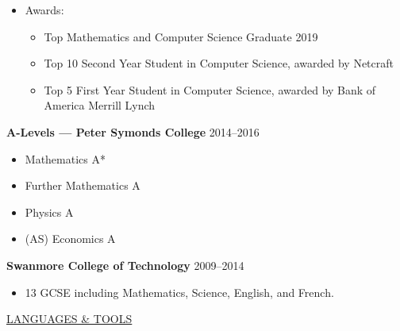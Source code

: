 \documentclass{letter}
\begin{document}
\begin{itemize}
  \item Awards:
        \begin{itemize}
          \setlength\itemsep{0pt}
          \item Top Mathematics and Computer Science Graduate 2019
          \item Top 10 Second Year Student in Computer Science, awarded by Netcraft
          \item Top 5 First Year Student in Computer Science, awarded by Bank of America Merrill Lynch
        \end{itemize}
\end{itemize}

\textbf{A-Levels --- Peter Symonds College} \hfill 2014--2016
\vspace{-5pt}
\begin{itemize}
  \setlength\itemsep{0pt}
  \item Mathematics A*
  \item Further Mathematics A
  \item Physics A
  \item (AS) Economics A
\end{itemize}

\textbf{Swanmore College of Technology} \hfill 2009--2014
\vspace{-5pt}
\begin{itemize}
  \item 13 GCSE including Mathematics, Science, English, and French.
\end{itemize}

\vspace{10pt}

\uline{{\large LANGUAGES \& TOOLS}\hfill}

\vspace{5pt}
\end{document}
